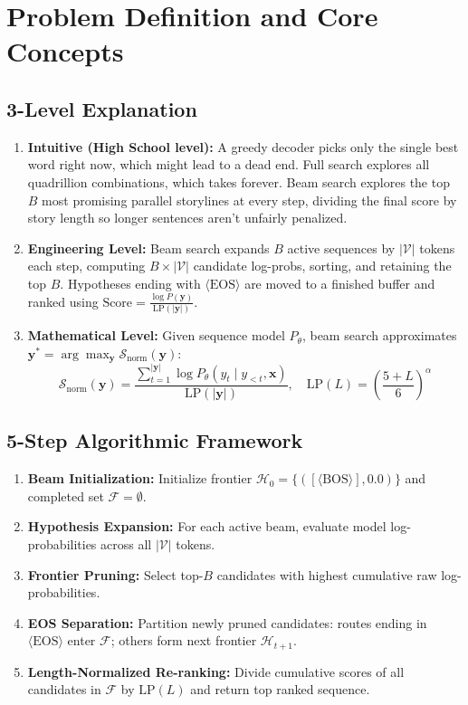 \documentclass[11pt,a4paper]{article}
\theoremstyle{definition}
\begin{document}
\section{Problem Definition and Core Concepts}

\subsection{3-Level Explanation}
\begin{enumerate}
    \item \textbf{Intuitive (High School level):} A greedy decoder picks only the single best word right now, which might lead to a dead end. Full search explores all quadrillion combinations, which takes forever. Beam search explores the top $B$ most promising parallel storylines at every step, dividing the final score by story length so longer sentences aren't unfairly penalized.
    \item \textbf{Engineering Level:} Beam search expands $B$ active sequences by $|\mathcal{V}|$ tokens each step, computing $B \times |\mathcal{V}|$ candidate log-probs, sorting, and retaining the top $B$. Hypotheses ending with $\langle \text{EOS} \rangle$ are moved to a finished buffer and ranked using $\text{Score} = \frac{\log P(\mathbf{y})}{\text{LP}(|\mathbf{y}|)}$.
    \item \textbf{Mathematical Level:} Given sequence model $P_\theta$, beam search approximates $\mathbf{y}^* = \arg\max_\mathbf{y} \mathcal{S}_{\text{norm}}(\mathbf{y})$:
    \begin{equation}
    \mathcal{S}_{\text{norm}}(\mathbf{y}) = \frac{\sum_{t=1}^{|\mathbf{y}|} \log P_\theta(y_t \mid y_{<t}, \mathbf{x})}{\text{LP}(|\mathbf{y}|)}, \quad \text{LP}(L) = \left( \frac{5 + L}{6} \right)^\alpha
    \end{equation}
\end{enumerate}

\subsection{5-Step Algorithmic Framework}
\begin{enumerate}
    \item \textbf{Beam Initialization:} Initialize frontier $\mathcal{H}_0 = \{([\langle \text{BOS} \rangle], 0.0)\}$ and completed set $\mathcal{F} = \emptyset$.
    \item \textbf{Hypothesis Expansion:} For each active beam, evaluate model log-probabilities across all $|\mathcal{V}|$ tokens.
    \item \textbf{Frontier Pruning:} Select top-$B$ candidates with highest cumulative raw log-probabilities.
    \item \textbf{EOS Separation:} Partition newly pruned candidates: routes ending in $\langle \text{EOS} \rangle$ enter $\mathcal{F}$; others form next frontier $\mathcal{H}_{t+1}$.
    \item \textbf{Length-Normalized Re-ranking:} Divide cumulative scores of all candidates in $\mathcal{F}$ by $\text{LP}(L)$ and return top ranked sequence.
\end{enumerate}
\end{document}
